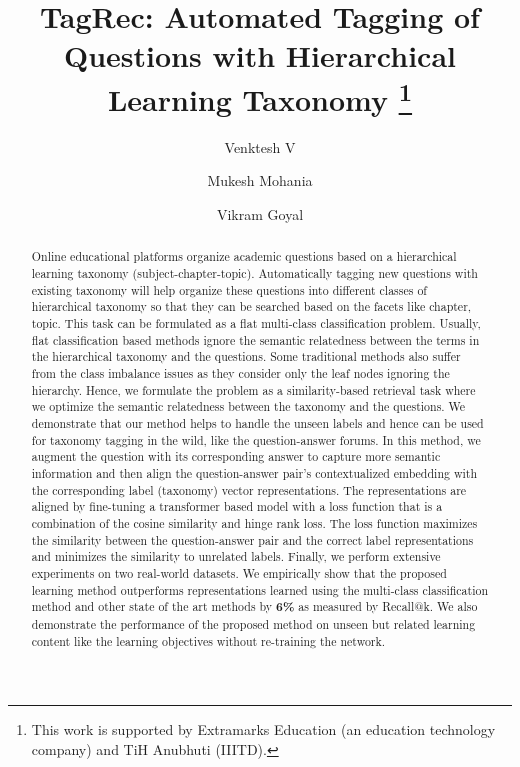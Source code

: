 \documentclass[runningheads, envcountsame, a4paper]{llncs}
\begin{document}
\title{TagRec: Automated Tagging of Questions with Hierarchical Learning Taxonomy \thanks{This work is supported by Extramarks Education (an education technology company) and TiH Anubhuti (IIITD).}}
\author{Venktesh V \and
Mukesh Mohania \and
Vikram Goyal}


\maketitle   \setcounter{footnote}{0} 
\begin{abstract}
Online educational platforms organize academic questions based on a hierarchical learning taxonomy (subject-chapter-topic). Automatically tagging new questions with existing taxonomy will help organize these questions into different classes of hierarchical taxonomy so that they can be searched based on the facets like chapter, topic. This task can be formulated as a flat multi-class classification problem. Usually, flat classification based methods ignore the semantic relatedness between the terms in the hierarchical taxonomy and the questions. Some traditional methods also suffer from the class imbalance issues as they consider only the leaf nodes ignoring the hierarchy.  Hence, we formulate the problem as a similarity-based retrieval task where we optimize the semantic relatedness between the taxonomy and the questions. We demonstrate that our method helps to handle the unseen labels and hence can be used for taxonomy tagging in the wild, like the question-answer forums. In this method, we augment the question with its corresponding answer to capture more semantic information and then align the question-answer pair's contextualized embedding with the corresponding label (taxonomy) vector representations. The representations are aligned by fine-tuning a transformer based model with a loss function that is a combination of the cosine similarity and hinge rank loss. The loss function maximizes the similarity between the question-answer pair and the correct label representations and minimizes the similarity to unrelated labels. Finally, we perform extensive experiments on two real-world datasets. We empirically show that the proposed learning method outperforms representations learned using the multi-class classification method and other state of the art methods by \textbf{6\%} as measured by Recall@k. We also demonstrate the performance of the proposed method on unseen but related learning content like the learning objectives without re-training the network.
\end{abstract}
\end{document}
